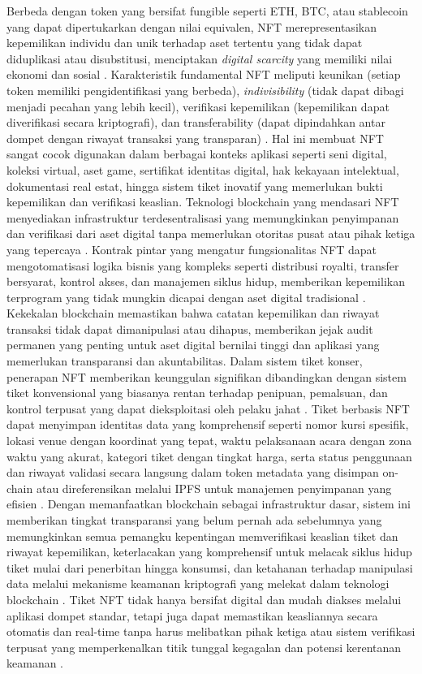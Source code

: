 Berbeda dengan token yang bersifat fungible seperti ETH, BTC, atau stablecoin yang dapat dipertukarkan dengan nilai equivalen, NFT merepresentasikan kepemilikan individu dan unik terhadap aset tertentu yang tidak dapat diduplikasi atau disubstitusi, menciptakan \emph{digital scarcity} yang memiliki nilai ekonomi dan sosial \parencite{Chalmers2022}. Karakteristik fundamental NFT meliputi keunikan (setiap token memiliki pengidentifikasi yang berbeda), \emph{indivisibility} (tidak dapat dibagi menjadi pecahan yang lebih kecil), verifikasi kepemilikan (kepemilikan dapat diverifikasi secara kriptografi), dan transferability (dapat dipindahkan antar dompet dengan riwayat transaksi yang transparan) \parencite{Nadini2021}. Hal ini membuat NFT sangat cocok digunakan dalam berbagai konteks aplikasi seperti seni digital, koleksi virtual, aset game, sertifikat identitas digital, hak kekayaan intelektual, dokumentasi real estat, hingga sistem tiket inovatif yang memerlukan bukti kepemilikan dan verifikasi keaslian.
Teknologi blockchain yang mendasari NFT menyediakan infrastruktur terdesentralisasi yang memungkinkan penyimpanan dan verifikasi dari aset digital tanpa memerlukan otoritas pusat atau pihak ketiga yang tepercaya \parencite{Ante2022}. Kontrak pintar yang mengatur fungsionalitas NFT dapat mengotomatisasi logika bisnis yang kompleks seperti distribusi royalti, transfer bersyarat, kontrol akses, dan manajemen siklus hidup, memberikan kepemilikan terprogram yang tidak mungkin dicapai dengan aset digital tradisional \parencite{Kugler2021}. Kekekalan blockchain memastikan bahwa catatan kepemilikan dan riwayat transaksi tidak dapat dimanipulasi atau dihapus, memberikan jejak audit permanen yang penting untuk aset digital bernilai tinggi dan aplikasi yang memerlukan transparansi dan akuntabilitas.
Dalam sistem tiket konser, penerapan NFT memberikan keunggulan signifikan dibandingkan dengan sistem tiket konvensional yang biasanya rentan terhadap penipuan, pemalsuan, dan kontrol terpusat yang dapat dieksploitasi oleh pelaku jahat \parencite{Sarmah2018}. Tiket berbasis NFT dapat menyimpan identitas data yang komprehensif seperti nomor kursi spesifik, lokasi venue dengan koordinat yang tepat, waktu pelaksanaan acara dengan zona waktu yang akurat, kategori tiket dengan tingkat harga, serta status penggunaan dan riwayat validasi secara langsung dalam token metadata yang disimpan on-chain atau direferensikan melalui IPFS untuk manajemen penyimpanan yang efisien \parencite{Dowling2022}.
Dengan memanfaatkan blockchain sebagai infrastruktur dasar, sistem ini memberikan tingkat transparansi yang belum pernah ada sebelumnya yang memungkinkan semua pemangku kepentingan memverifikasi keaslian tiket dan riwayat kepemilikan, keterlacakan yang komprehensif untuk melacak siklus hidup tiket mulai dari penerbitan hingga konsumsi, dan ketahanan terhadap manipulasi data melalui mekanisme keamanan kriptografi yang melekat dalam teknologi blockchain \parencite{Wilson2022}. Tiket NFT tidak hanya bersifat digital dan mudah diakses melalui aplikasi dompet standar, tetapi juga dapat memastikan keasliannya secara otomatis dan real-time tanpa harus melibatkan pihak ketiga atau sistem verifikasi terpusat yang memperkenalkan titik tunggal kegagalan dan potensi kerentanan keamanan \parencite{Chohan2021}.

